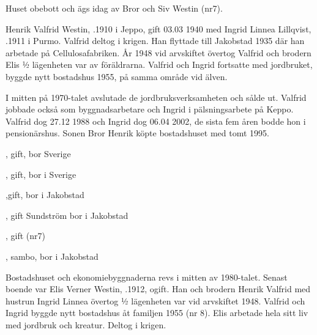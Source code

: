 %

%
Huset obebott och ägs idag av Bror och Siv Westin (nr7).\jhvspace{}



%
Henrik Valfrid Westin, .1910 i Jeppo, gift 03.03 1940 med Ingrid Linnea Lillqvist, .1911 i Purmo. Valfrid deltog i krigen. Han flyttade till Jakobstad 1935 där han arbetade på Cellulosafabriken. År 1948 vid arvskiftet övertog Valfrid och brodern Elis ½ lägenheten var av föräldrarna. Valfrid och Ingrid fortsatte med jordbruket, byggde nytt bostadshus 1955, på samma område vid älven.

I mitten på 1970-talet avslutade de jordbruksverksamheten och sålde ut. Valfrid jobbade också som byggnadsarbetare och Ingrid i pälsningsarbete på Keppo. Valfrid dog 27.12 1988 och Ingrid dog 06.04 2002, de sista fem åren bodde hon i  pensionärshus. Sonen Bror Henrik köpte bostadshuset med tomt 1995.
\begin{jhchildren}
  \item {}, gift, bor Sverige
  \item {}, gift, bor i Sverige
  \item {},gift, bor i Jakobstad
  \item {}, gift Sundström bor i Jakobstad
  \item {}, gift (nr7)
  \item {}, sambo, bor i Jakobstad
\end{jhchildren}



%



%
Bostadshuset och ekonomiebyggnaderna revs i mitten av 1980-talet. Senast boende var Elis Verner Westin, .1912, ogift. Han och brodern Henrik Valfrid med hustrun Ingrid Linnea övertog ½ lägenheten var vid arvskiftet 1948. Valfrid och Ingrid byggde nytt bostadshus åt familjen 1955 (nr 8). Elis arbetade hela sitt liv med jordbruk och kreatur. Deltog i krigen.

